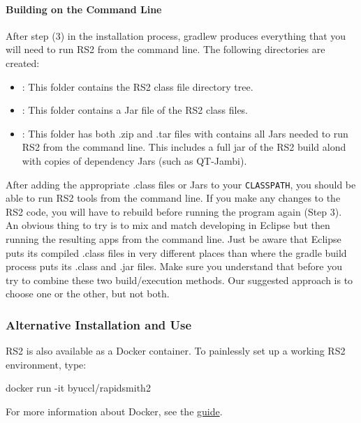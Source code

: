 \begin{enumerate}
  \paragraph{Building on the Command Line} After step (3) in the installation
  process, gradlew produces everything that you will need to run RS2 from the
  command line. The following directories are created: 
  \begin{itemize}
    \item {}: This folder contains the RS2 class file
    directory tree.
    \item {}: This folder contains a Jar file of the RS2 class
    files.
    \item {}: This folder has both .zip and .tar files
    with contains all Jars needed to run RS2 from the command line. This
    includes a full jar of the RS2 build alond with copies of dependency Jars
    (such as QT-Jambi).
  \end{itemize} 
  After adding the appropriate .class files or Jars to your \texttt{CLASSPATH},
  you should be able to run RS2 tools from the command line. If you make any
  changes to the RS2 code, you will have to rebuild before running the program
  again (Step 3).  An obvious thing to try is to mix and match
  developing in Eclipse but then running the resulting apps from the command
  line. Just be aware that Eclipse puts its compiled .class files in very
  different places than where the gradle build process puts its .class and
  .jar files. Make sure you understand that before you try to combine these two
  build/execution methods. Our suggested approach is to choose one or the
  other, but not both.
\end{enumerate}

\subsubsection{Alternative Installation and Use}

RS2 is also available as a Docker container. To painlessly set up a working RS2 environment, type:
\vspace{-0.05in}
\begin{code}
docker run -it byuccl/rapidsmith2
\end{code}
\vspace{0.04in}
For more information about Docker, see the \href{https://docs.docker.com/engine/getstarted/}{\color{blue}guide}.

